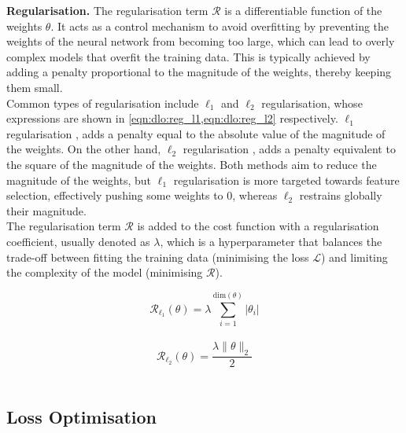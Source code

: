 \noindent \textbf{Regularisation.} The regularisation term $\mathcal{R}$ is a
differentiable function of the weights $\theta$. It acts as a control mechanism
to avoid overfitting by preventing the weights of the neural network from
becoming too large, which can lead to overly complex models that overfit the
training data. This is typically achieved by adding a penalty proportional to
the magnitude of the weights, thereby keeping them small.\\

Common types of regularisation include $\ell_1$ and $\ell_2$ regularisation,
whose expressions are shown in \cref{eqn:dlo:reg_l1,eqn:dlo:reg_l2}
respectively. $\ell_1$ regularisation \cite{tibshirani1996regression}, adds a
penalty equal to the absolute value of the magnitude of the weights. On the
other hand, $\ell_2$ regularisation \cite{hoerl1970ridge}, adds a penalty
equivalent to the square of the magnitude of the weights. Both methods aim to
reduce the magnitude of the weights, but $\ell_1$ regularisation is more
targeted towards feature selection, effectively pushing some weights to $0$,
whereas $\ell_2$ restrains globally their magnitude.\\

The regularisation term $\mathcal{R}$ is added to the cost function with a
regularisation coefficient, usually denoted as $\lambda$, which is a
hyperparameter that balances the trade-off between fitting the training data
(minimising the loss $\mathcal{L}$) and limiting the complexity of the model
(minimising $\mathcal{R}$).

\begin{equation}
  \label{eqn:dlo:reg_l1}
  \mathcal{R}_{\ell_1}(\theta) = \lambda \sum_{i=1}^{\text{dim}(\theta)} \left| \theta_i \right|
\end{equation}\\

\begin{equation}
  \label{eqn:dlo:reg_l2}
  \mathcal{R}_{\ell_2}(\theta) = \frac{\lambda \| \theta \|_2}{2} 
\end{equation}\\

\subsection{Loss Optimisation}\label{sec:dlo:backpropagation}


